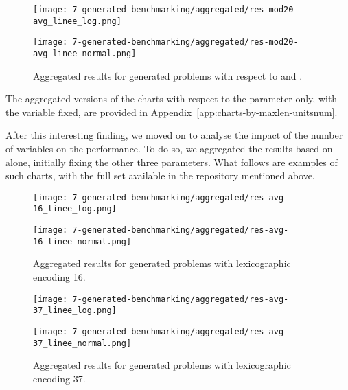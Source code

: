 \begin{figure}[H]
  \centering
  \texttt{[image: 7-generated-benchmarking/aggregated/res-mod20-avg\_linee\_log.png]}
\end{figure}
\begin{figure}[H]
  \centering
  \texttt{[image: 7-generated-benchmarking/aggregated/res-mod20-avg\_linee\_normal.png]}
  \caption{Aggregated results for generated problems with respect to  and .}\label{fig:agg-maxlen-unitsnum}
\end{figure}
The aggregated versions of the charts with respect to the  parameter only, with the variable fixed, are provided in Appendix~\ref{app:charts-by-maxlen-unitsnum}.

After this interesting finding, we moved on to analyse the impact of the number of variables on the performance.
To do so, we aggregated the results based on  alone, initially fixing the other three parameters.
What follows are examples of such charts, with the full set available in the repository mentioned above.

\begin{figure}[H]
  \centering
  \begin{minipage}{1\textwidth}
    \centering
    \texttt{[image: 7-generated-benchmarking/aggregated/res-avg-16\_linee\_log.png]}
  \end{minipage}
  \hfill
  \begin{minipage}{1\textwidth}
    \centering
    \texttt{[image: 7-generated-benchmarking/aggregated/res-avg-16\_linee\_normal.png]}
  \end{minipage}
  \caption{Aggregated results for generated problems with lexicographic encoding 16.}\label{fig:agg-le16}
\end{figure}

\begin{figure}[H]
  \centering
  \begin{minipage}{1\textwidth}
    \centering
    \texttt{[image: 7-generated-benchmarking/aggregated/res-avg-37\_linee\_log.png]}
  \end{minipage}
  \hfill
  \begin{minipage}{1\textwidth}
    \centering
    \texttt{[image: 7-generated-benchmarking/aggregated/res-avg-37\_linee\_normal.png]}
  \end{minipage}
  \caption{Aggregated results for generated problems with lexicographic encoding 37.}\label{fig:agg-le37}
\end{figure}

